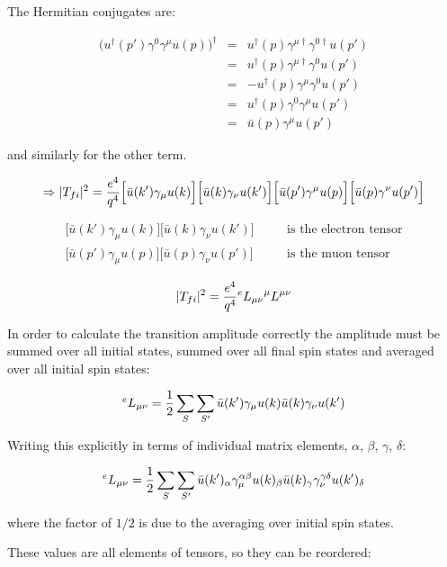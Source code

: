 The Hermitian conjugates are:

\begin{eqnarray*}
  \big(u^{\dagger}(p')\gamma^0\gamma^{\mu}u(p)\big)^{\dagger} & = & u^{\dagger}(p)\gamma^{\mu\dagger}\gamma^{0\dagger}u(p') \\
  & = & u^{\dagger}(p)\gamma^{\mu\dagger}\gamma^0u(p') \\
  & = & -u^{\dagger}(p)\gamma^{\mu}\gamma^0u(p') \\
  & = & u^{\dagger}(p)\gamma^0\gamma^{\mu}u(p') \\
  & = & \bar{u}(p)\gamma^{\mu}u(p')
\end{eqnarray*}

and similarly for the other term.

\[
  \Rightarrow |T_{fi}|^2 = \frac{e^4}{q^4}
                           \Big[\bar{u}(k')\gamma_{\mu}u(k)\Big]
                           \Big[\bar{u}(k)\gamma_{\nu}u(k')\Big]
                           \Big[\bar{u}(p')\gamma^{\mu}u(p)\Big]
                           \Big[\bar{u}(p)\gamma^{\nu}u(p')\Big]
\]

\begin{eqnarray*}
  \Big[\bar{u}(k')\gamma_{\mu}u(k)\Big]
  \Big[\bar{u}(k)\gamma_{\nu}u(k')\Big]
  & \quad & \textrm{is the electron tensor} \\
  \Big[\bar{u}(p')\gamma_{\mu}u(p)\Big]
  \Big[\bar{u}(p)\gamma_{\nu}u(p')\Big]
  & \quad & \textrm{is the muon tensor}
\end{eqnarray*}

\[
  |T_{fi}|^2 = \frac{e^4}{q^4} {}^{e}L_{\mu\nu} {}^{\mu}L^{\mu\nu}
\]

In order to calculate the transition amplitude correctly the amplitude must be summed over all initial states, summed over all final spin states and averaged over all initial spin states:

\[
  ^{e}L_{\mu\nu} = \frac{1}{2}\sum_{S}\sum_{S'} \bar{u}(k')\gamma_{\mu}u(k)\bar{u}(k)\gamma_{\nu}u(k')
\]

Writing this explicitly in terms of individual matrix elements, $\alpha$, $\beta$, $\gamma$, $\delta$:

\[
  ^{e}L_{\mu\nu} = \frac{1}{2}\sum_{S}\sum_{S'}\bar{u}(k')_{\alpha}\gamma_{\mu}^{\alpha\beta}u(k)_{\beta}\bar{u}(k)_{\gamma}\gamma_{\nu}^{\gamma\delta}u(k')_{\delta}
\]

where the factor of $1/2$ is due to the averaging over initial spin states.

These values are all elements of tensors, so they can be reordered:

